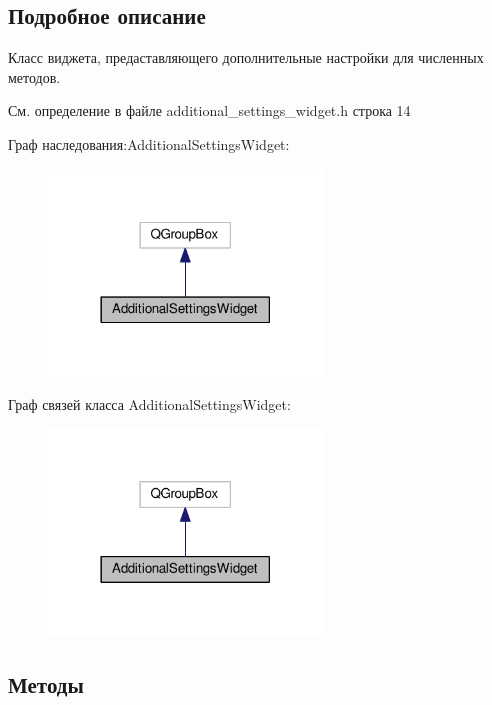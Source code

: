 \subsection{Подробное описание}
Класс виджета, предаставляющего дополнительные настройки для численных методов. 

См. определение в файле additional\+\_\+settings\+\_\+widget.\+h строка 14



Граф наследования\+:Additional\+Settings\+Widget\+:
\nopagebreak
\begin{figure}[H]
\begin{center}
\leavevmode
\includegraphics[width=206pt]{class_additional_settings_widget__inherit__graph}
\end{center}
\end{figure}


Граф связей класса Additional\+Settings\+Widget\+:
\nopagebreak
\begin{figure}[H]
\begin{center}
\leavevmode
\includegraphics[width=206pt]{class_additional_settings_widget__coll__graph}
\end{center}
\end{figure}


\subsection{Методы}
